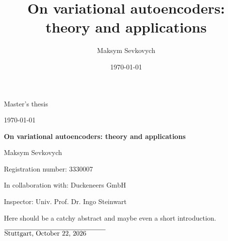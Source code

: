 \documentclass[12pt, a4paper]{scrreprt}
\title{On variational autoencoders: theory and applications}
\date{\today}
\author{Maksym Sevkovych}
\theoremstyle{plain}
\theoremstyle{definition}
\theoremstyle{plain}
\begin{document}
\begin{titlepage}
\vspace*{1 cm}
\begin{center}
\LARGE{Master's thesis}

\vspace{0.5 cm}

\large{\today}

\vspace{0.5 cm}

\Huge{\textbf{On variational autoencoders: theory and applications}}

\vspace{0.5 cm}

\Large{Maksym Sevkovych}

\Large{Registration number: 3330007}

\Large{In collaboration with: Duckeneers GmbH}
\vspace{1 cm}

\Large{Inspector: Univ. Prof. Dr. Ingo Steinwart}
\vspace{3cm}
\end{center}
Here should be a catchy abstract and maybe even a short introduction.
\end{titlepage}
\newpage
\tableofcontents


\iffalse



\fi



\vspace{4 cm}

$\overline{\text{Stuttgart, \today} \hspace{1 cm}}$
\end{document}
